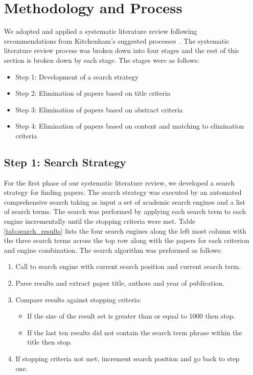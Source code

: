 \section{Methodology and Process} \label{sec:process}

We adopted and applied a systematic literature review following recommendations from Kitchenham's suggested processes~\cite{kitchenham2007guidelines}.  The systematic literature review process was broken down into four stages and the rest of this section is broken down by each stage.  The stages were as follows:

\begin{itemize}
\setlength{\itemsep}{0.25pt}
\item Step 1: Development of a search strategy
\item Step 2: Elimination of papers based on title criteria
\item Step 3: Elimination of papers based on abstract criteria
\item Step 4: Elimination of papers based on content and matching to elimination criteria
\end{itemize}

\subsection{Step 1: Search Strategy}

For the first phase of our systematic literature review, we developed a search strategy for finding papers.  The search strategy was executed by an automated comprehensive search taking as input a set of academic search engines and a list of search terms.  The search was performed by applying each search term to each engine incrementally until the stopping criteria were met. Table \ref{tab:search_results} lists the four search engines along the left most column with the three search terms across the top row along with the papers for each criterion and engine combination.  The search algorithm was performed as follows:

\begin{enumerate}
\setlength{\itemsep}{0.25pt}
\item Call to search engine with current search position and current search term.
\item Parse results and extract paper title, authors and year of publication.
\item Compare results against stopping criteria:
	\begin{itemize}
	\item If the size of the result set is greater than or equal to 1000 then stop.
	\item If the last ten results did not contain the search term phrase within the title then stop.
	\end{itemize}
\item If stopping criteria not met, increment search position and go back to step one.
\end{enumerate}

